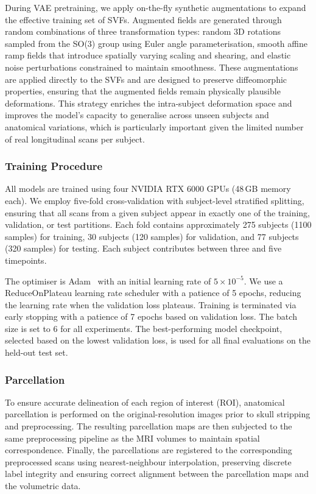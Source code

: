 During VAE pretraining, we apply on-the-fly synthetic augmentations to expand the effective training set of SVFs. Augmented fields are generated through random combinations of three transformation types: random 3D rotations sampled from the SO(3) group using Euler angle parameterisation, smooth affine ramp fields that introduce spatially varying scaling and shearing, and elastic noise perturbations constrained to maintain smoothness. These augmentations are applied directly to the SVFs and are designed to preserve diffeomorphic properties, ensuring that the augmented fields remain physically plausible deformations. This strategy enriches the intra-subject deformation space and improves the model's capacity to generalise across unseen subjects and anatomical variations, which is particularly important given the limited number of real longitudinal scans per subject.

\subsubsection*{Training Procedure}

All models are trained using four NVIDIA RTX 6000 GPUs (48\,GB memory each). We employ five-fold cross-validation with subject-level stratified splitting, ensuring that all scans from a given subject appear in exactly one of the training, validation, or test partitions. Each fold contains approximately 275 subjects (1100 samples) for training, 30 subjects (120 samples) for validation, and 77 subjects (320 samples) for testing. Each subject contributes between three and five timepoints.

The optimiser is Adam~\cite{kingma2015adam} with an initial learning rate of $5 \times 10^{-5}$. We use a ReduceOnPlateau learning rate scheduler with a patience of 5 epochs, reducing the learning rate when the validation loss plateaus. Training is terminated via early stopping with a patience of 7 epochs based on validation loss. The batch size is set to 6 for all experiments. The best-performing model checkpoint, selected based on the lowest validation loss, is used for all final evaluations on the held-out test set.

\subsubsection*{Parcellation}

To ensure accurate delineation of each region of interest (ROI), anatomical parcellation is performed on the original-resolution images prior to skull stripping and preprocessing. The resulting parcellation maps are then subjected to the same preprocessing pipeline as the MRI volumes to maintain spatial correspondence. Finally, the parcellations are registered to the corresponding preprocessed scans using nearest-neighbour interpolation, preserving discrete label integrity and ensuring correct alignment between the parcellation maps and the volumetric data.



